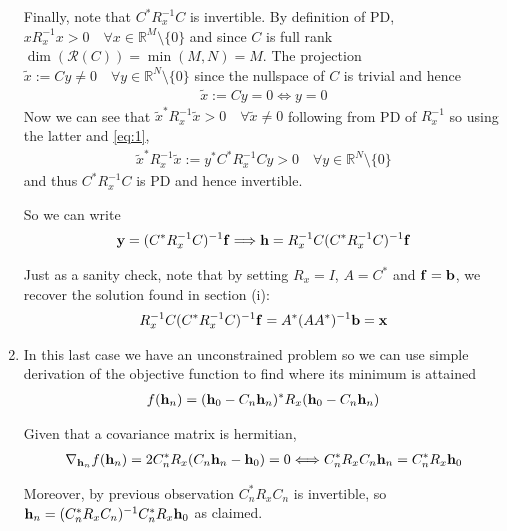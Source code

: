 \documentclass{article}
\begin{document}
\begin{enumerate}[label=(\roman*)]
        Finally, note that $C^* R_x^{-1} C$ is invertible. By definition of PD, $x R_x^{-1} x > 0\quad \forall x \in \mathbb{R}^M \setminus \{0\}$ and since $C$ is full rank $\dim (\mathcal{R}(C)) = \min(M,N)= M$. The projection $\tilde{x} := C y \neq 0\quad \forall y \in \mathbb{R}^N \setminus \{0\}$ since the nullspace of $C$ is trivial and hence
        \begin{align}
        \tilde{x}  := C y = 0 \Longleftrightarrow y = 0 \label{eq:1}
        \end{align}
        Now we can see that $\tilde{x}^* R_x^{-1} \tilde{x} > 0\quad \forall \tilde{x} \neq 0$ following from PD of $R_x^{-1}$ so using the latter and \eqref{eq:1},
        \begin{align}
        \tilde{x}^* R_x^{-1} \tilde{x} := y^* C^* R_x^{-1} C y > 0\quad \forall y \in \mathbb{R}^N \setminus \{0\} \tag{2}
        \end{align}
        and thus $C^* R_x^{-1} C$ is PD and hence invertible.
        
        
        So we can write
        \begin{align}
            \mathbf{y} = (C^* R_x^{-1} C)^{-1} \mathbf{f} \Longrightarrow \mathbf{h} = R_x^{-1} C (C^* R_x^{-1} C)^{-1} \mathbf{f}
        \end{align}
        
        Just as a sanity check, note that by setting $R_x = I$, $A = C^*$ and $\mathbf{f} = \mathbf{b}$, we recover the solution found in section (i):
        \begin{align}
            R_x^{-1} C (C^* R_x^{-1} C)^{-1} \mathbf{f} = A^* (A A^*)^{-1} \mathbf{b} = \mathbf{x}
        \end{align}
        \item In this last case we have an unconstrained problem so we can use simple derivation of the objective function to find where its minimum is attained
        \begin{align}
            f(\mathbf{h}_n) = (\mathbf{h}_0 - C_n \mathbf{h}_n )^* R_x (\mathbf{h}_0 - C_n \mathbf{h}_n )
        \end{align}
        
        Given that a covariance matrix is hermitian,
        \begin{align}
            \nabla_{\mathbf{h}_n} f(\mathbf{h}_n) = 2 C_n^* R_x (C_n \mathbf{h}_n - \mathbf{h}_0) = 0 \Longleftrightarrow C_n^* R_x C_n \mathbf{h}_n =  C_n^* R_x \mathbf{h}_0
        \end{align}
        
        Moreover, by previous observation $C_n^* R_x C_n$ is invertible, so $\mathbf{h}_n = (C_n^* R_x C_n)^{-1} C_n^* R_x \mathbf{h}_0$ as claimed.
    \end{enumerate}
\end{document}
